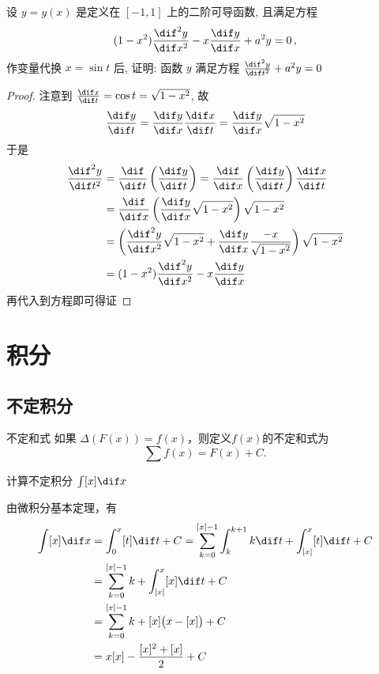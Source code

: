 \documentclass[color=green,titlestyle=hang]{elegantbook}%
\begin{document}
\begin{example}
设 $y=y(x)$ 是定义在 $[-1,1]$ 上的二阶可导函数, 且满足方程
\[(1-x^2)\frac{\dif^2y}{\dif x^2}-x\frac{\dif y}{\dif x}+a^2y=0\,,\]
作变量代换 $x=\sin t$ 后, 证明: 函数 $y$ 满足方程 $\frac{\dif^2y}{\dif t^2}+a^2y=0$
\end{example}\begin{proof}
注意到 $\frac{\dif x}{\dif t}=\cos t=\sqrt{1-x^2}$, 故
\[\frac{\dif y}{\dif t}=\frac{\dif y}{\dif x}\frac{\dif x}{\dif t}=\frac{\dif y}{\dif x}\sqrt{1-x^2}\]
于是\begin{align*}
\frac{\dif^2y}{\dif t^2}&=\frac{\dif}{\dif t}\left(\frac{\dif y}{\dif t}\right)=\frac{\dif}{\dif x}\left(\frac{\dif y}{\dif t}\right)\frac{\dif x}{\dif t}\\
&=\frac{\dif}{\dif x}\left(\frac{\dif y}{\dif x}\sqrt{1-x^2}\right)\sqrt{1-x^2}\\
&=\left(\frac{\dif^2y}{\dif x^2}\sqrt{1-x^2}+\frac{\dif y}{\dif x}\frac{-x}{\sqrt{1-x^2}}\right)\sqrt{1-x^2}\\
&=(1-x^2)\frac{\dif^2y}{\dif x^2}-x\frac{\dif y}{\dif x}
\end{align*}
再代入到方程即可得证
\end{proof}

\chapter{积分}
\section{不定积分}

\begin{definition}{不定和式}{}
如果 $\Delta(F(x))=f(x)$，则定义$f(x)$的{\color{blue}不定和式}为
\[ \sum f(x) = F(x) + C. \]
\end{definition}

\begin{example}
计算不定积分 $\int[x]\dif x$
\end{example}\begin{solution}
由微积分基本定理，有
\begin{align*}
\int[x]\dif x&=\int_0^x[t]\dif t+C=\sum_{k=0}^{[x]-1}\int_k^{k+1}k\dif t+\int_{[x]}^x[t]\dif t+C\\
&=\sum_{k=0}^{[x]-1}k+\int_{[x]}^x[x]\dif t+C\\
&=\sum_{k=0}^{[x]-1}k+[x]\big(x-[x]\big)+C\\
&=x[x]-\frac{[x]^2+[x]}{2}+C
\end{align*}	
\end{solution}
\end{document}
